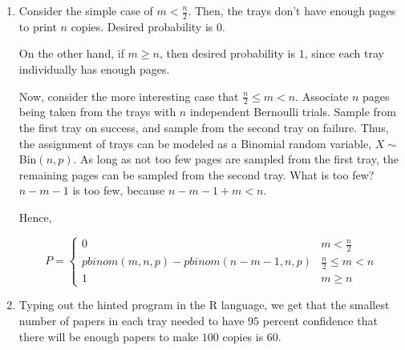 \begin{enumerate}[label=(\alph*)]

\item 
Consider the simple case of $m < \frac{n}{2}$. Then, the trays don't have enough
pages to print $n$ copies. Desired probability is $0$.

On the other hand, if $m \geq n$, then desired probability is $1$, since each
tray individually has enough pages.

Now, consider the more interesting case that $\frac{n}{2} \leq m < n$.
Associate $n$ pages being taken from the trays with $n$ independent Bernoulli
trials. Sample from the first tray on success, and sample from the second tray
on failure. Thus, the assignment of trays can be modeled as a Binomial random
variable, $X \sim $ Bin$(n, p)$. As long as not too few pages are sampled from
the first tray, the remaining pages can be sampled from the second tray. What is
too few? $n-m-1$ is too few, because $n-m-1 + m < n$.

Hence,

\[ P = \begin{cases} 
      0 & m < \frac{n}{2} \\
      pbinom(m,n,p) - pbinom(n-m-1,n,p) & \frac{n}{2} \leq m < n \\
      1 & m \geq n
   \end{cases}
\]

\item Typing out the hinted program in the R language, we get that the smallest
number of papers in each tray needed to have $95$ percent confidence that there
will be enough papers to make $100$ copies is $60$.

\end{enumerate}